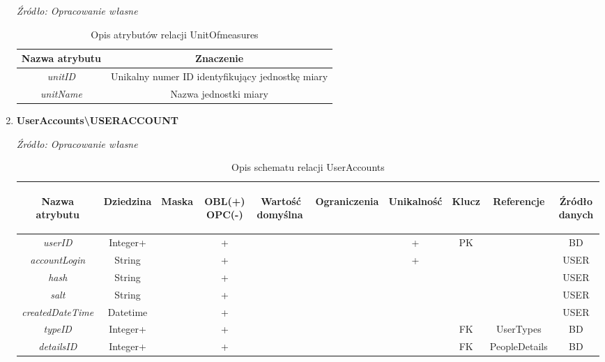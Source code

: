 \documentclass[12pt,twoside]{report}
\begin{document}
\begin{enumerate}[start=10,label={\bfseries REL\textbackslash\arabic*}]
	\begin{table}[H]
		\caption{Opis atrybutów relacji UnitOfmeasures}
		\textit{Źródło: Opracowanie własne}
		\label{UnitOfmeasuresAttributeDescription}
		\centering
		\begin{tabular}{|c|c|}
			\hline
			Nazwa atrybutu & Znaczenie \\
						\hline
			\textit{unitID}&Unikalny numer ID identyfikujący jednostkę miary\\	
			\hline
			\textit{unitName}&Nazwa jednostki miary\\	
			\hline
		\end{tabular}
	\end{table}
	\item \textbf{UserAccounts\textbackslash USERACCOUNT}
	\begin{table}[H]
		\caption{Opis schematu relacji UserAccounts}
		\textit{Źródło: Opracowanie własne}
		\label{UserAccountsRelationSchema}
		\centering
		\begin{tabular}{|c|c|c|c|c|c|c|c|c|c|}
			\hline
			\begin{sideways}Nazwa atrybutu\end{sideways}& 
			\begin{sideways}Dziedzina \end{sideways}& 
			\begin{sideways}Maska \end{sideways}& 
			\begin{sideways}OBL(+) OPC(-)\end{sideways} & 
			\begin{sideways}Wartość domyślna$\ $\end{sideways}& 
			\begin{sideways}Ograniczenia\end{sideways} &
			\begin{sideways}Unikalność \end{sideways}& 
			\begin{sideways}Klucz \end{sideways}& 
			\begin{sideways}Referencje \end{sideways}&
			\begin{sideways}Źródło danych\end{sideways}\\
			\hline
			\textit{userID}&Integer+&&+&&&+&PK&&BD\\	
			\hline
			\textit{accountLogin}&String&&+&&&+&&&USER\\	
			\hline			
			\textit{hash}&String&&+&&&&&&USER\\	
			\hline			
			\textit{salt}&String&&+&&&&&&USER\\	
			\hline			
			\textit{createdDateTime}&Datetime&&+&&&&&&USER\\	
			\hline			
			\textit{typeID}&Integer+&&+&&&&FK&UserTypes&BD\\	
			\hline			
			\textit{detailsID}&Integer+&&+&&&&FK&PeopleDetails&BD\\	
			\hline
		\end{tabular}
	\end{table}
	

\end{enumerate}
\end{document}
